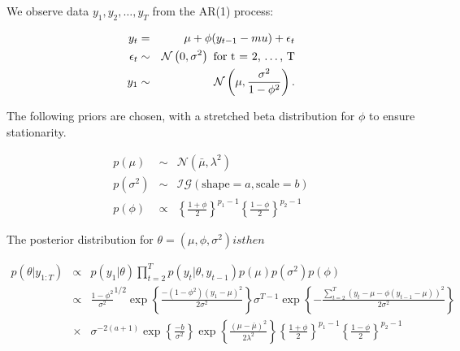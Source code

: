 \documentclass{article}
\begin{document}


We observe data $y_1, y_2, \dots, y_T$ from the AR(1) process:

\begin{eqnarray*}
y_t & = & \mu + \phi(y_{t-1} - mu) + \epsilon_t \\
\epsilon_t & \sim & \mathcal{N}\left(0, \sigma^2\right) \mbox{ for t = 2, \dots, T} \\
y_1 & \sim & \mathcal{N}\left(\mu, \frac{\sigma^2}{1-\phi^2}\right).
\end{eqnarray*}

The following priors are chosen, with a stretched beta distribution for $\phi$ to ensure stationarity.

\begin{eqnarray*}
p(\mu) & \sim & \mathcal{N}\left(\bar{\mu}, \lambda^2\right) \\
p(\sigma^2) & \sim & \mathcal{IG} \left(\mbox{shape} = a, \mbox{scale} = b\right) \\
p(\phi) & \propto & \left\{\frac{1+\phi}{2}\right\}^{p_1 - 1}\left\{\frac{1-\phi}{2}\right\}^{p_2 - 1}
\end{eqnarray*}

The posterior distribution for $\theta = (\mu, \phi, \sigma^2) is then$

\begin{eqnarray*}
p(\theta | y_{1:T}) & \propto & p(y_1 | \theta) \prod_{t = 2}^{T} p(y_t | \theta, y_{t-1}) p(\mu)p(\sigma^2)p(\phi) \\
& \propto & \frac{1-\phi^2}{\sigma^2}^{1/2} \exp\left\{\frac{-(1-\phi^2)(y_1-\mu)^2}{2\sigma^2}\right\} \sigma^{T-1} \exp\left\{
-\frac{\sum_{t=2}^{T}(y_t - \mu - \phi(y_{t-1} - \mu))^2}{2\sigma^2}\right\} \\
& \times & \sigma^{-2(a + 1)} \exp\left\{ \frac{-b}{\sigma^2}\right\} \exp\left\{ \frac{(\mu - \bar{\mu})^2}{2\lambda^2}\right\}
\left\{\frac{1+\phi}{2}\right\}^{p_1 - 1}\left\{\frac{1-\phi}{2}\right\}^{p_2 - 1}
\end{eqnarray*}
\end{document}
